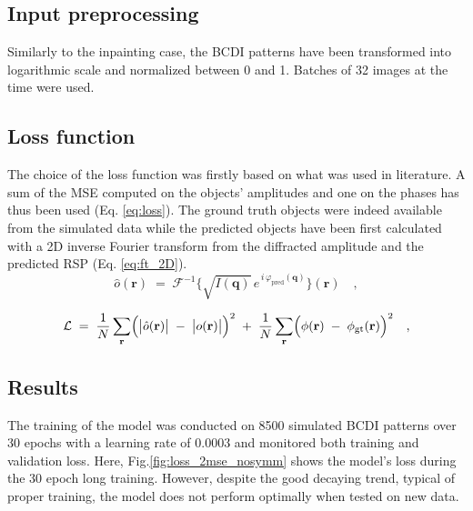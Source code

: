 \subsection{Input preprocessing} 

Similarly to the inpainting case, the BCDI patterns have been transformed into logarithmic scale and normalized between 
0 and 1. Batches of 32 images at the time were used. 

\subsection{Loss function}
The choice of the loss function was firstly based on what was used in literature. 
A sum of the MSE computed on the objects' amplitudes and one on the phases has thus been used (Eq. \ref{eq:loss}). The ground truth 
objects were indeed available from the simulated data while the predicted objects have been first calculated with a 2D  
inverse Fourier transform from the diffracted amplitude and the predicted RSP (Eq. \ref{eq:ft_2D}). 
\begin{equation}
    \hat{o}(\mathbf{r})
    \;=\;
    \mathcal{F}^{-1}\!\bigl\{\sqrt{I(\mathbf{q})}\,e^{\,i\,\varphi_{\mathrm{pred}}(\mathbf{q})}\bigr\}(\mathbf{r})
    \quad,
    \label{eq:ft_2D}
\end{equation}

\begin{equation}
    \mathcal{L}
    \;=\;
    \frac{1}{N}\sum_{\mathbf{r}}
    \Bigl(\bigl|\hat{o}(\mathbf{r})\bigr|
        \;-\;\bigl|o(\mathbf{r})\bigr|\Bigr)^{2}
    \;+\;
    \frac{1}{N}\sum_{\mathbf{r}}
    \Bigl(\phi(\mathbf{r})
        \;-\;\phi_{\mathrm{gt}}(\mathbf{r})\Bigr)^{2}
    \quad,
    \label{eq:loss}
\end{equation}

\subsection{Results}
The training of the model was conducted on 8500 simulated BCDI patterns over 30 epochs with a learning rate of 0.0003
and monitored both training and validation loss. Here, Fig.\ref{fig:loss_2mse_nosymm} shows the model's loss during the 
30 epoch long training. However, despite the good decaying trend, typical of proper training, the model does not 
perform optimally when tested on new data. 

